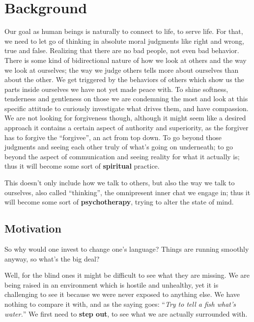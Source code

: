 \chapter{Background}\label{ch:background}


Our goal as human beings is naturally to connect to life, to serve life.
For that, we need to let go of thinking in absolute moral judgments like right and wrong, true and false.
Realizing that there are no bad people, not even bad behavior.
There is some kind of bidirectional nature of how we look at others and the way we look at ourselves; the way we judge others tells more about ourselves than about the other.
We get triggered by the behaviors of others which show us the parts inside ourselves we have not yet made peace with.
To shine softness, tenderness and gentleness on those we are condemning the most and look at this specific attitude to curiously investigate what drives them, and have compassion.
We are not looking for forgiveness though, although it might seem like a desired approach it contains a certain aspect of authority and superiority, as the forgiver has to forgive the ``forgivee'', an act from top down.
To go beyond those judgments and seeing each other truly of what's going on underneath; to go beyond the aspect of communication and seeing reality for what it actually is; thus it will become some sort of \textbf{spiritual} practice.

This doesn't only include how we talk to others, but also the way we talk to ourselves, also called ``thinking'', the omnipresent inner chat we engage in; thus it will become some sort of \textbf{psychotherapy}, trying to alter the state of mind.


\section{Motivation}\label{sec:motivation}

So why would one invest to change one's language?
Things are running smoothly anyway, so what's the big deal?

Well, for the blind ones it might be difficult to see what they are missing.
We are being raised in an environment which is hostile and unhealthy, yet it is challenging to see it because we were never exposed to anything else.
We have nothing to compare it with, and as the saying goes:
``\textit{Try to tell a fish what's water.}''
We first need to \textbf{step out}, to see what we are actually surrounded with.

